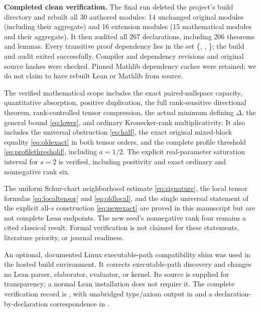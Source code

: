 \textbf{Completed clean verification.} The final run deleted the project's build directory and rebuilt all 30 authored modules: 14 unchanged original modules (including their aggregate) and 16 extension modules (15 mathematical modules and their aggregate). It then audited all 267 declarations, including 206 theorems and lemmas. Every transitive proof dependency lies in the set \{, , \}; the build and audit exited successfully. Compiler and dependency revisions and original source hashes were checked. Pinned Mathlib dependency caches were retained; we do not claim to have rebuilt Lean or Mathlib from source.

The verified mathematical scope includes the exact paired-nullspace capacity, quantitative absorption, positive duplication, the full rank-sensitive directional theorem, rank-controlled tensor compression, the actual minimum defining $\Delta$, the general bound \eqref{eq:lower}, and ordinary Kronecker-rank multiplicativity. It also includes the universal obstruction \eqref{eq:half}, the exact original mixed-block equality \eqref{eq:oldexact} in both tensor orders, and the complete profile threshold \eqref{eq:profilethreshold}, including $a=1/2$. The explicit real-parameter saturation interval for $s=2$ is verified, including positivity and exact ordinary and nonnegative rank six.

The uniform Schur-chart neighborhood estimate \eqref{eq:signature}, the local tensor formulas \eqref{eq:localtensor} and \eqref{eq:oldlocal}, and the single universal statement of the explicit all-$s$ construction \eqref{eq:newexact} are proved in this manuscript but are not complete Lean endpoints. The new seed's nonnegative rank four remains a cited classical result. Formal verification is not claimed for these statements, literature priority, or journal readiness.

An optional, documented Linux executable-path compatibility shim was used in the hosted build environment. It corrects executable-path discovery and changes no Lean parser, elaborator, evaluator, or kernel. Its source is supplied for transparency; a normal Lean installation does not require it. The complete verification record is , with unabridged type/axiom output in  and a declaration-by-declaration correspondence in .
